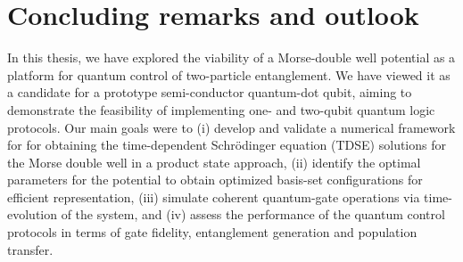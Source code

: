 \documentclass{subfiles}
\begin{document}
\chapter{Concluding remarks and outlook}\label{chap:5}
In this thesis, we have explored the viability of a Morse-double well potential as a platform for quantum control of two-particle entanglement. We have viewed it as a candidate for a prototype semi-conductor quantum-dot qubit, aiming to demonstrate the feasibility of implementing one- and two-qubit quantum logic protocols. Our main goals were to (i) develop and validate a numerical framework for for obtaining the time-dependent Schrödinger equation (TDSE) solutions for the Morse double well in a product state approach, (ii) identify the optimal parameters for the potential to obtain optimized basis-set configurations for efficient representation, (iii) simulate coherent quantum-gate operations via time-evolution of the system, and (iv) assess the performance of the quantum control protocols in terms of gate fidelity, entanglement generation and population transfer.
\end{document}
